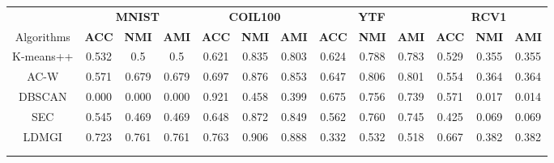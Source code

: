 \begin{tabular}{|c|ccc|ccc|ccc|ccc|}	

\hline	
\addlinespace[0.1em]
& \multicolumn{3}{c|}{\textbf{MNIST}  } & \multicolumn{3}{c|}{\textbf{COIL100}  } & \multicolumn{3}{c|}{\textbf{YTF} } & \multicolumn{3}{c|}{\textbf{RCV1}} \\

Algorithms	&	\textbf{ACC}	&	\textbf{NMI}	&	\textbf{AMI}	&	\textbf{ACC}	&	\textbf{NMI}	&	\textbf{AMI}	&	\textbf{ACC}	&	\textbf{NMI}	&	\textbf{AMI}	&	\textbf{ACC}	&	\textbf{NMI}	&	\textbf{AMI}	\\	\hline	
\addlinespace[0.1em]
K-means++	&	0.532	&	0.5	&	0.5	&	0.621	&	0.835	&	0.803	&	0.624	&	0.788	&	0.783	&	0.529	&	0.355	&	0.355	\\																					
AC-W	&	0.571	&	0.679	&	0.679	&	0.697	&	0.876	&	0.853	&	0.647	&	0.806	&	0.801	&	0.554	&	0.364	&	0.364	\\																					
DBSCAN	&	0.000	&	0.000	&	0.000	&	0.921	&	0.458	&	0.399	&	0.675	&	0.756	&	0.739	&	0.571	&	0.017	&	0.014	\\																					
SEC	&	0.545	&	0.469	&	0.469	&	0.648	&	0.872	&	0.849	&	0.562	&	0.760	&	0.745	&	0.425	&	0.069	&	0.069	\\																					
LDMGI	&	0.723	&	0.761	&	0.761	&	0.763	&	0.906	&	0.888	&	0.332	&	0.532	&	0.518	&	0.667	&	0.382	&	0.382	\\																
\hline
\addlinespace[0.1em]
\multicolumn{1}{c}{\textbf{Deep Learning} } & \multicolumn{1}{l}{} & \multicolumn{1}{l}{} & \multicolumn{1}{l}{} & \multicolumn{1}{l}{} & \multicolumn{1}{l}{} & \multicolumn{1}{l}{} & \multicolumn{1}{l}{} & \multicolumn{1}{l}{} & \multicolumn{1}{l}{} & \multicolumn{1}{l}{} & \multicolumn{1}{l}{} & \multicolumn{1}{l}{} \\ \hline	
\addlinespace[0.1em]


\end{tabular}
